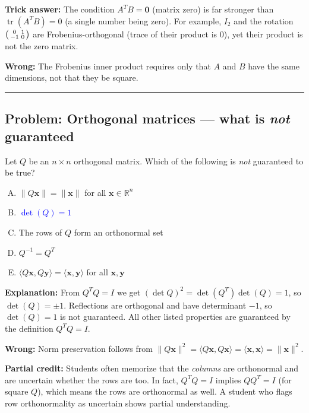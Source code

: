 \documentclass[12pt]{amsart}
\newcommand{\divider}{
  \vspace{-1em}
  \noindent
  \raisebox{-0.15ex}{\textbullet}%
  \hspace{0.5em}%
  \rule[0.5ex]{0.95\textwidth}{1.0pt}%
  \hspace{0.5em}%
  \raisebox{-0.15ex}{\textbullet}%
  \vspace{0em}
}
\begin{document}
\textbf{Trick answer:}
The condition $A^TB = \mathbf{0}$ (matrix zero) is far stronger than
$\operatorname{tr}(A^TB) = 0$ (a single number being zero).
For example, $I_2$ and the rotation $\begin{psmallmatrix}0&1\\-1&0\end{psmallmatrix}$
are Frobenius-orthogonal (trace of their product is $0$), yet their product is
not the zero matrix.

\textbf{Wrong:}
The Frobenius inner product requires only that $A$ and $B$ have the same
dimensions, not that they be square.

\divider

\subsection*{Problem: Orthogonal matrices --- what is \emph{not} guaranteed}

Let $Q$ be an $n\times n$ orthogonal matrix.
Which of the following is \emph{not} guaranteed to be true?

\begin{enumerate}[(A)]
\item $\|Q\mathbf{x}\| = \|\mathbf{x}\|$ for all $\mathbf{x} \in \mathbb{R}^n$
\item \textcolor{blue}{\textbf{$\det(Q) = 1$}}
\item The rows of $Q$ form an orthonormal set
\item $Q^{-1} = Q^T$
\item $\langle Q\mathbf{x}, Q\mathbf{y} \rangle = \langle \mathbf{x}, \mathbf{y} \rangle$ for all $\mathbf{x}, \mathbf{y}$
\end{enumerate}

\textbf{Explanation:}
From $Q^TQ = I$ we get $(\det Q)^2 = \det(Q^T)\det(Q) = 1$, so $\det(Q) = \pm 1$.
Reflections are orthogonal and have determinant $-1$, so $\det(Q) = 1$ is
not guaranteed.
All other listed properties are guaranteed by the definition $Q^TQ = I$.

\textbf{Wrong:}
Norm preservation follows from
$\|Q\mathbf{x}\|^2 = \langle Q\mathbf{x},Q\mathbf{x}\rangle = \langle\mathbf{x},\mathbf{x}\rangle = \|\mathbf{x}\|^2$.

\textbf{Partial credit:}
Students often memorize that the \emph{columns} are orthonormal and are
uncertain whether the rows are too.
In fact, $Q^TQ = I$ implies $QQ^T = I$ (for square $Q$), which means the rows
are orthonormal as well.
A student who flags row orthonormality as uncertain shows partial understanding.
\end{document}
